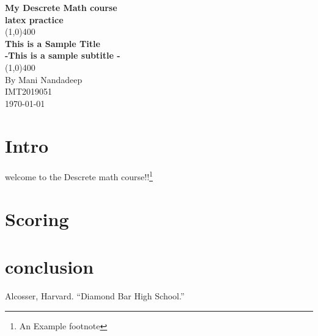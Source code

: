 \documentclass[11pt]{article}
\begin{document}
\begin{titlepage}
\begin{center}
\vspace*{1cm}
\Large{\textbf{My Descrete Math course}}\\
\Large{\textbf{latex practice}}\\
\vfill
\line(1,0){400}\\[1mm]
\huge{\textbf{This is a Sample Title}}\\[3mm]
\Large{\textbf{-This is a sample subtitle -}}\\[1mm]
\line(1,0){400}\\
\vfill
By Mani Nandadeep\\
IMT2019051\\
\today \\
\end{center}
\end{titlepage}

\tableofcontents
\thispagestyle{empty}
\clearpage
\setcounter{page}{1}

\section{Intro}
welcome to the Descrete math course!!\footnote{An Example footnote}\cite{DBHS1}
\section{Scoring}

\section{conclusion}

\pagebreak
\begin{thebibliography}{}

Alcosser, Harvard.
``Diamond Bar High School.''

\end{thebibliography}
\end{document}
